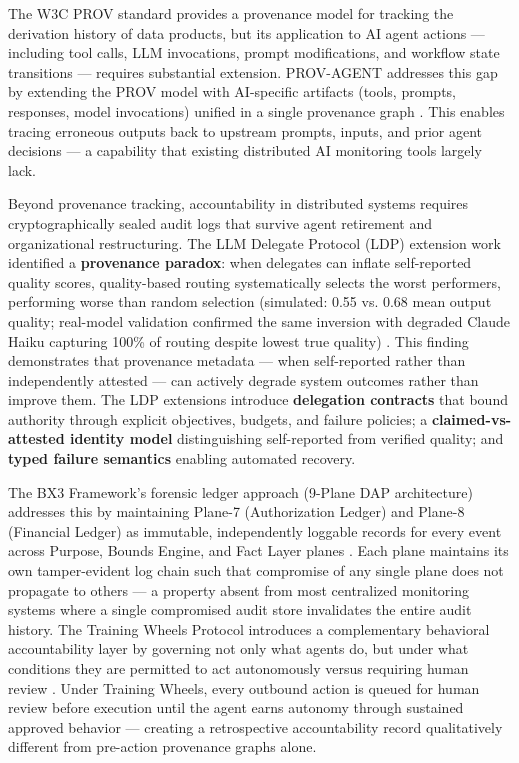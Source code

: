 The W3C PROV standard provides a provenance model for tracking the derivation history of data products, but its application to AI agent actions — including tool calls, LLM invocations, prompt modifications, and workflow state transitions — requires substantial extension. PROV-AGENT addresses this gap by extending the PROV model with AI-specific artifacts (tools, prompts, responses, model invocations) unified in a single provenance graph \cite{prov_agent_2025}. This enables tracing erroneous outputs back to upstream prompts, inputs, and prior agent decisions — a capability that existing distributed AI monitoring tools largely lack.

Beyond provenance tracking, accountability in distributed systems requires cryptographically sealed audit logs that survive agent retirement and organizational restructuring. The LLM Delegate Protocol (LDP) extension work identified a \textbf{provenance paradox}: when delegates can inflate self-reported quality scores, quality-based routing systematically selects the worst performers, performing worse than random selection (simulated: 0.55 vs. 0.68 mean output quality; real-model validation confirmed the same inversion with degraded Claude Haiku capturing 100\% of routing despite lowest true quality) \cite{provance_paradox_2026}. This finding demonstrates that provenance metadata — when self-reported rather than independently attested — can actively degrade system outcomes rather than improve them. The LDP extensions introduce \textbf{delegation contracts} that bound authority through explicit objectives, budgets, and failure policies; a \textbf{claimed-vs-attested identity model} distinguishing self-reported from verified quality; and \textbf{typed failure semantics} enabling automated recovery.

The BX3 Framework's forensic ledger approach (9-Plane DAP architecture) addresses this by maintaining Plane-7 (Authorization Ledger) and Plane-8 (Financial Ledger) as immutable, independently loggable records for every event across Purpose, Bounds Engine, and Fact Layer planes \cite{bx3_universal_spec_2026}. Each plane maintains its own tamper-evident log chain such that compromise of any single plane does not propagate to others — a property absent from most centralized monitoring systems where a single compromised audit store invalidates the entire audit history. The Training Wheels Protocol introduces a complementary behavioral accountability layer by governing not only what agents do, but under what conditions they are permitted to act autonomously versus requiring human review \cite{training_wheels_protocol_2026}. Under Training Wheels, every outbound action is queued for human review before execution until the agent earns autonomy through sustained approved behavior — creating a retrospective accountability record qualitatively different from pre-action provenance graphs alone.

